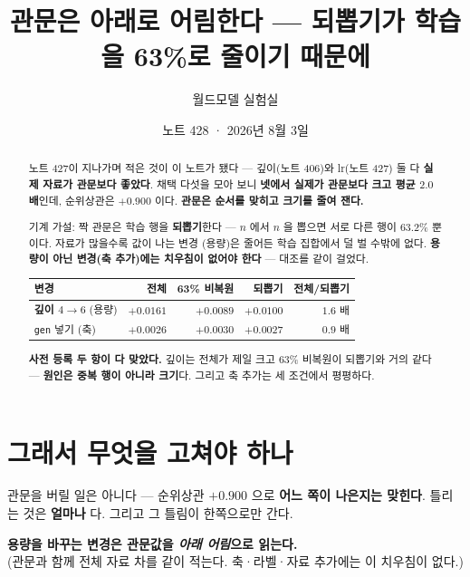 \documentclass[11pt]{article}
\begin{document}
\title{관문은 아래로 어림한다 --- 되뽑기가 학습을 63\%로 줄이기 때문에}
\author{월드모델 실험실}
\date{노트 428 · 2026년 8월 3일}
\maketitle

\begin{abstract}
노트 427이 지나가며 적은 것이 이 노트가 됐다 --- 깊이(노트 406)와
lr(노트 427) 둘 다 \textbf{실제 자료가 관문보다 좋았다}. 채택 다섯을 모아
보니 \textbf{넷에서 실제가 관문보다 크고 평균 $2.0$ 배}인데, 순위상관은
$+0.900$ 이다. \textbf{관문은 순서를 맞히고 크기를 줄여 잰다.}

기계 가설: 짝 관문은 학습 행을 \textbf{되뽑기}한다 --- $n$ 에서 $n$ 을
뽑으면 서로 다른 행이 $63.2\%$ 뿐이다. 자료가 많을수록 값이 나는 변경
(용량)은 줄어든 학습 집합에서 덜 벌 수밖에 없다. \textbf{용량이 아닌
변경(축 추가)에는 치우침이 없어야 한다} --- 대조를 같이 걸었다.

\begin{center}
\begin{tabular}{lrrrr}
\hline
변경 & 전체 & 63\% 비복원 & 되뽑기 & 전체/되뽑기 \\
\hline
\textbf{깊이 $4{\to}6$} (용량) & $\mathbf{+0.0161}$ & $+0.0089$ & $+0.0100$ & $\mathbf{1.6}$ 배 \\
\texttt{gen} 넣기 (축) & $+0.0026$ & $+0.0030$ & $+0.0027$ & $0.9$ 배 \\
\hline
\end{tabular}
\end{center}

\textbf{사전 등록 두 항이 다 맞았다.} 깊이는 전체가 제일 크고 63\% 비복원이
되뽑기와 거의 같다 --- \textbf{원인은 중복 행이 아니라 크기}다. 그리고
축 추가는 세 조건에서 평평하다.
\end{abstract}

\section{그래서 무엇을 고쳐야 하나}

관문을 버릴 일은 아니다 --- 순위상관 $+0.900$ 으로 \textbf{어느 쪽이 나은지는
맞힌다}. 틀리는 것은 \textbf{얼마나} 다. 그리고 그 틀림이 한쪽으로만 간다.

\begin{center}
\textbf{용량을 바꾸는 변경은 관문값을 \emph{아래 어림}으로 읽는다.}\\
(관문과 함께 전체 자료 차를 같이 적는다. 축·라벨·자료 추가에는 이 치우침이
없다.)
\end{center}
\end{document}
